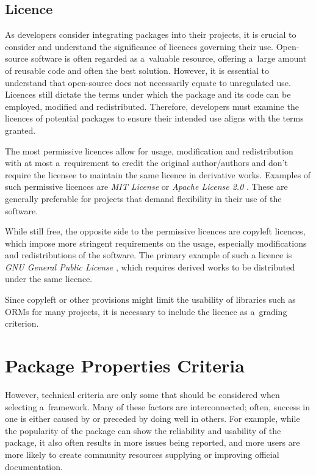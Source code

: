 \subsection{Licence}
As developers consider integrating packages into their projects, it is crucial
to consider and understand the significance of licences governing their use.
Open-source software is often regarded as a~valuable resource, offering a~large
amount of reusable code and often the best solution. However, it is essential to
understand that open-source does not necessarily equate to unregulated use.
Licences still dictate the terms under which the package and its code can be
employed, modified and redistributed. Therefore, developers must examine the
licences of potential packages to ensure their intended use aligns with the
terms granted.

The most permissive licences allow for usage, modification and redistribution
with at most a~requirement to credit the original author/authors and don't
require the licensee to maintain the same licence in derivative works. Examples
of such permissive licences are \textit{MIT License} \cite{MITLicense} or
\textit{Apache License 2.0} \cite{ApacheLicense2}. These are generally preferable
for projects that demand flexibility in their use of the software.

While still free, the opposite side to the permissive licences are copyleft
licences, which impose more stringent requirements on the usage, especially
modifications and redistributions of the software. The primary example of such a
licence is \textit{GNU General Public License} \cite{GNUGPL}, which requires
derived works to be distributed under the same licence.

Since copyleft or other provisions might limit the usability of libraries such
as ORMs for many projects, it is necessary to include the licence as a~grading
criterion.

\section{Package Properties Criteria}

However, technical criteria are only some that should be considered when
selecting a~framework. Many of these factors are interconnected; often, success
in one is either caused by or preceded by doing well in others. For example,
while the popularity of the package can show the reliability and usability of
the package, it also often results in more issues being reported, and more
users are more likely to create community resources supplying or improving
official documentation.

